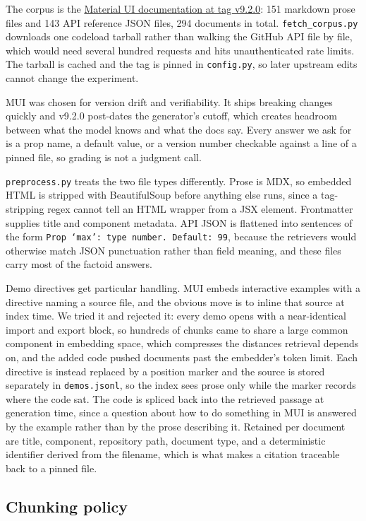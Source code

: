 \documentclass[10pt,a4paper]{article}
\begin{document}
The corpus is the \href{https://github.com/mui/material-ui}{Material UI documentation at tag v9.2.0}: 151 markdown prose files and 143 API reference JSON files, 294 documents in total. \texttt{fetch\_corpus.py} downloads one codeload tarball rather than walking the GitHub API file by file, which would need several hundred requests and hits unauthenticated rate limits. The tarball is cached and the tag is pinned in \texttt{config.py}, so later upstream edits cannot change the experiment.

MUI was chosen for version drift and verifiability. It ships breaking changes quickly and v9.2.0 post-dates the generator's cutoff, which creates headroom between what the model knows and what the docs say. Every answer we ask for is a prop name, a default value, or a version number checkable against a line of a pinned file, so grading is not a judgment call.

\texttt{preprocess.py} treats the two file types differently. Prose is MDX, so embedded HTML is stripped with BeautifulSoup before anything else runs, since a tag-stripping regex cannot tell an HTML wrapper from a JSX element. Frontmatter supplies title and component metadata. API JSON is flattened into sentences of the form \texttt{Prop `max': type number. Default: 99}, because the retrievers would otherwise match JSON punctuation rather than field meaning, and these files carry most of the factoid answers.

Demo directives get particular handling. MUI embeds interactive examples with a directive naming a source file, and the obvious move is to inline that source at index time. We tried it and rejected it: every demo opens with a near-identical import and export block, so hundreds of chunks came to share a large common component in embedding space, which compresses the distances retrieval depends on, and the added code pushed documents past the embedder's token limit. Each directive is instead replaced by a position marker and the source is stored separately in \texttt{demos.jsonl}, so the index sees prose only while the marker records where the code sat. The code is spliced back into the retrieved passage at generation time, since a question about how to do something in MUI is answered by the example rather than by the prose describing it. Retained per document are title, component, repository path, document type, and a deterministic identifier derived from the filename, which is what makes a citation traceable back to a pinned file.

\subsection{Chunking policy}
\end{document}
